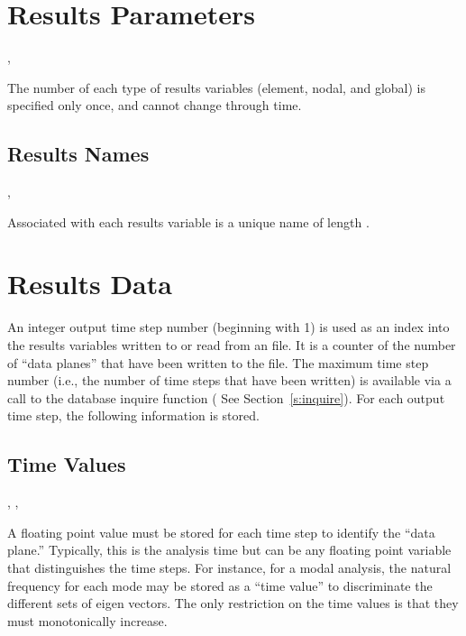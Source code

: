 \section{Results Parameters}

\api{}, 


The number of each type of results variables (element, nodal, 
and global) is specified only once, and cannot change through 
time.

\subsection{Results Names}

\begin{spacing}{1.5}
\api {}, 
\end{spacing}

Associated with each results variable is a unique name of 
length .



\section{Results Data}


An integer output time step number (beginning with 1) is used as an
index into the results variables written to or read from an \exo{}
file. It is a counter of the number of ``data planes'' that have been
written to the file. The maximum time step number (i.e., the number of
time steps that have been written) is available via a call to the
database inquire function ( See Section~\ref{s:inquire}). For each
output time step, the following information is stored.

\subsection{Time Values}

\begin{spacing}{1.5}
\api {}, , 
\end{spacing}

A floating point value must be stored for each time step to identify
the ``data plane.'' Typically, this is the analysis time but can be
any floating point variable that distinguishes the time steps. For
instance, for a modal analysis, the natural frequency for each mode
may be stored as a ``time value'' to discriminate the different sets
of eigen vectors. The only restriction on the time values is that they
must monotonically increase.

